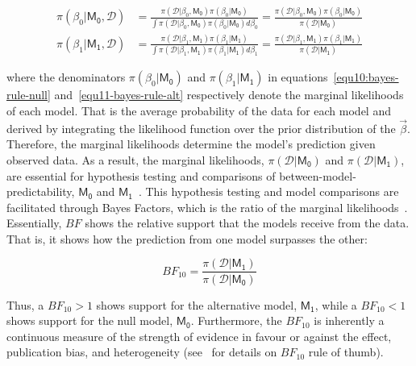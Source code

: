 \documentclass[12pt, english]{article}
\begin{document}
    \begin{align}
        \pi(\beta_0 | \mathsf{M_0}, \mathcal{D}) &= \frac{\pi(\mathcal{D} | \beta_0, \mathsf{M_0}) \pi(\beta_0 | \mathsf{M_0})}{\int\pi(\mathcal{D} | \beta_0, \mathsf{M_0}) \pi(\beta_0 | \mathsf{M_0}) d\beta_0} = \frac{\pi(\mathcal{D} | \beta_0, \mathsf{M_0}) \pi(\beta_0 | \mathsf{M_0})}{\pi(\mathcal{D} | \mathsf{M_0})} \label{equ10:bayes-rule-null} \\
        \pi(\beta_1 | \mathsf{M_1}, \mathcal{D}) &= \frac{\pi(\mathcal{D} | \beta_1, \mathsf{M_1})\pi(\beta_1 | \mathsf{M_1})}{\int\pi(\mathcal{D} | \beta_1, \mathsf{M_1}) \pi(\beta_1|\mathsf{M_1}) d\beta_1} = \frac{\pi(\mathcal{D} | \beta_1, \mathsf{M_1}) \pi(\beta_1 | \mathsf{M_1})}{\pi(\mathcal{D} | \mathsf{M_1})} \label{equ11-bayes-rule-alt}
    \end{align}

    where the denominators $\pi(\beta_0 | \mathsf{M_0})$ and $\pi(\beta_1 | \mathsf{M_1})$ in equations~\ref{equ10:bayes-rule-null} and~\ref{equ11-bayes-rule-alt} respectively denote the marginal likelihoods of each model. That is the average probability of the data for each model and derived by integrating the likelihood function over the prior distribution of the $\vec{\beta}$. Therefore, the marginal likelihoods determine the model's prediction given observed data. As a result, the marginal likelihoods, $\pi(\mathcal{D}  |\mathsf{M_0})$ and $\pi(\mathcal{D} | \mathsf{M_1})$, are essential for hypothesis testing and comparisons of between-model-predictability, $\mathsf{M_0}$ and $\mathsf{M_1}$~\parencite{jefferysberger1992}. This hypothesis testing and model comparisons are facilitated through Bayes Factors, which is the ratio of the marginal likelihoods~\parencites{roudermorey2019, etzwagenmakers2017, kassraftery1995, wrinchjeffreys1921}. Essentially, $BF$ shows the relative support that the models receive from the data. That is, it shows how the prediction from one model surpasses the other:

    \begin{equation}
        \label{equ12:bayes-factor}
        BF_{10}=\frac{\pi(\mathcal{D}|\mathsf{M_1})}{\pi(\mathcal{D}|\mathsf{M_0})}
    \end{equation}

    Thus, a $BF_{10}>1$ shows support for the alternative model, $\mathsf{M_1}$, while a $BF_{10}<1$ shows support for the null model, $\mathsf{M_0}$. Furthermore, the $BF_{10}$ is inherently a continuous measure of the strength of evidence in favour or against the effect, publication bias, and heterogeneity (see~\parencites{bartos2022, leewagenmakers2013, jeffreys1998} for details on $BF_{10}$ rule of thumb).
\end{document}
